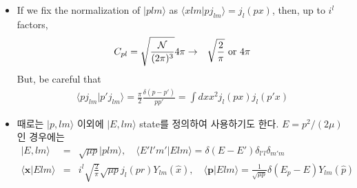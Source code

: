 \documentclass[10pt]{book}
\def\bm{\boldsymbol}
\newcommand{\bea}{\begin{eqnarray}}
\newcommand{\eea}{\end{eqnarray}}
\newcommand{\no}{\nonumber \\}
\def\vp{{\bm p}}
\def\vx{{\bm x}}
\def\la{\langle}
\def\ra{\rangle}
\begin{document}
\begin{itemize}
\item If we fix the normalization of $|p lm\ra $ as
      $\la x lm|p j_{lm}\ra=j_l(px)$, then, up to $i^{l}$ factors,
      \bea 
      C_{pl}=\sqrt{\frac{\cal N}{(2\pi)^3}}4\pi&\to& \sqrt{\frac{2}{\pi}}
                                     \mbox{ or } 4\pi 
      \eea 
      But, be careful that
      \bea 
      \la p j_{lm}|p' j_{lm}\ra =\frac{\pi}{2}\frac{\delta(p-p')}{pp'}
                        =\int dx x^2 j_l(px) j_l(p'x) 
      \eea 
            
      \item 때로는 $|p,lm\ra$ 이외에 $|E,lm\ra$ state를 정의하여 사용하기도 한다.
      $E=p^2/(2\mu)$ 인 경우에는
      \bea
      |E,lm\ra&=&\sqrt{\mu p}|p lm\ra,\quad  
      \la E' l' m'|E l m\ra=\delta(E-E')\delta_{l'l}\delta_{m'm}\no
      \la \vx| E lm\ra&=& i^l\sqrt{\frac{2}{\pi}}\sqrt{\mu p} j_l(pr)Y_{lm}(\hat{x}),\quad
      \la \vp| E lm\ra=
      \frac{1}{\sqrt{\mu p}}\delta(E_p-E) Y_{lm}(\hat{p})
      \eea
\end{itemize}
\end{document}
